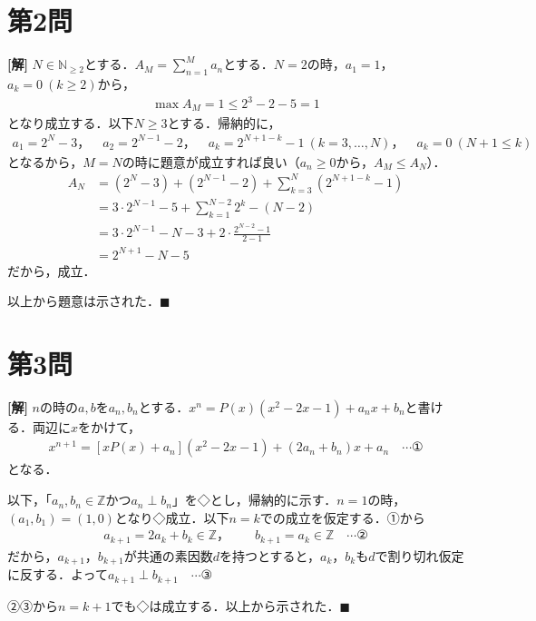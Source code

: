 \documentclass[../main.tex]{subfiles}
\begin{document}
\newpage

\section*{第2問}

{\bf [解]}
$N\in\mathbb{N}_{\ge2}$とする．$A_M=\displaystyle\sum_{n=1}^Ma_n$とする．$N=2$の時，$a_1=1$，$a_k=0\ (k\ge2)$から，
\begin{align*}
  \max A_M=1\le2^3-2-5=1
\end{align*}
となり成立する．以下$N\ge3$とする．帰納的に，
\begin{align*}
  a_1=2^N-3，\quad a_2=2^{N-1}-2，\quad a_k=2^{N+1-k}-1\ (k=3,\ldots,N)，\quad a_k=0\ (N+1\le k)
\end{align*}
となるから，$M=N$の時に題意が成立すれば良い（$a_n\ge0$から，$A_M\le A_N$）．
\begin{align*}
  A_N&=(2^N-3)+(2^{N-1}-2)+\sum_{k=3}^N(2^{N+1-k}-1)\\
  &=3\cdot2^{N-1}-5+\sum_{k=1}^{N-2}2^k-(N-2)\\
  &=3\cdot2^{N-1}-N-3+2\cdot\frac{2^{N-2}-1}{2-1}\\
  &=2^{N+1}-N-5
\end{align*}
だから，成立．

以上から題意は示された．$\blacksquare$

\newpage

\section*{第3問}

{\bf [解]}
$n$の時の$a,b$を$a_n,b_n$とする．$x^n=P(x)(x^2-2x-1)+a_nx+b_n$と書ける．両辺に$x$をかけて，
\begin{align*}
  x^{n+1}=\left[xP(x)+a_n\right](x^2-2x-1)+(2a_n+b_n)x+a_n\quad\cdots①
\end{align*}
となる．

以下，「$a_n,b_n\in\mathbb{Z}$かつ$a_n\perp b_n$」を◇とし，帰納的に示す．$n=1$の時，$(a_1,b_1)=(1,0)$となり◇成立．以下$n=k$での成立を仮定する．①から
\begin{align*}
  a_{k+1}=2a_k+b_k\in\mathbb{Z}，\qquad b_{k+1}=a_k\in\mathbb{Z}\quad\cdots②
\end{align*}
だから，$a_{k+1}$，$b_{k+1}$が共通の素因数$d$を持つとすると，$a_k$，$b_k$も$d$で割り切れ仮定に反する．よって$a_{k+1}\perp b_{k+1}\quad\cdots③$

②③から$n=k+1$でも◇は成立する．以上から示された．$\blacksquare$
\end{document}
